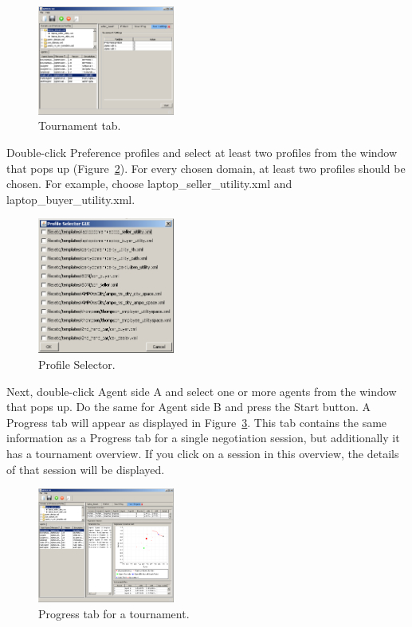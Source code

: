 \documentclass[]{article}
\begin{document}
\begin{figure}[htb]
	\centering
	\includegraphics[width=0.4\textwidth]{media/image16.png}
\caption{Tournament tab.}\label{Fig:tournament}
\end{figure}

Double-click Preference profiles and select at least two profiles from the window that pops up (Figure~\ref{Fig:profile}). For every chosen domain, at least two profiles should be chosen. For example, choose laptop\_seller\_utility.xml and laptop\_buyer\_utility.xml.

\begin{figure}[htb]
	\centering
	\includegraphics[width=0.4\textwidth]{media/image17.png}
\caption{Profile Selector.}\label{Fig:profile}
\end{figure}

Next, double-click Agent side A and select one or more agents from the window that pops up. Do the same for Agent side B and press the Start button. A Progress tab will appear as displayed in Figure~\ref{Fig:tournament progress}. This tab contains the same information as a Progress tab for a single negotiation session, but additionally it has a tournament overview. If you click on a session in this overview, the details of that session will be displayed.

\begin{figure}[htb]
	\centering
	\includegraphics[width=0.4\textwidth]{media/image18.png}
\caption{Progress tab for a tournament.}\label{Fig:tournament progress}
\end{figure}
\end{document}
